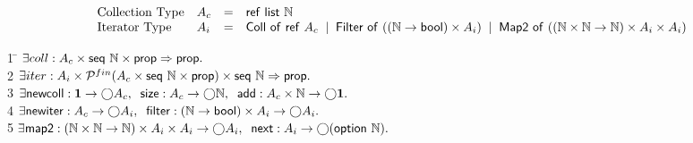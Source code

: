 \documentclass[preprint,natbib]{sigplanconf}
\begin{document}
{\small
\begin{displaymath}
\begin{array}{llcl}
\mbox{Collection Type} & 
A_c & = & \mbox{\textsf{{ref }}}\mbox{\textsf{{list }}}{\mathbb{N}} \\
\mbox{Iterator Type} &
A_i & = & \mbox{\textsf{{Coll of }}}\mbox{\textsf{{ref }}}A_c \;\;|\;\;
          \mbox{\textsf{{Filter of }}}((\mathbb{N} \to \mbox{\textsf{{bool}}}) \times A_i) \;\;|\;\;
          \mbox{\textsf{{Map2 of }}}((\mathbb{N} \times \mathbb{N} \to \mathbb{N}) \times A_i \times A_i) 
\\
\end{array}
\end{displaymath}
\begin{tabbing}
1 \qquad \= $\exists coll : A_c \times \mbox{\textsf{{seq }}}{\mathbb{N}} \times \mbox{\textsf{{prop}}} \Rightarrow \mbox{\textsf{{prop}}}.$ \\
2 \> 
$\exists iter : A_i \times \mathcal{P}^{fin}(A_c \times \mbox{\textsf{{seq }}}{\mathbb{N}} \times \mbox{\textsf{{prop}}}) \times \mbox{\textsf{{seq }}}{\mathbb{N}} \Rightarrow \mbox{\textsf{{prop}}}.$ \\
3 \> 
$\exists \mbox{\textsf{{newcoll}}} : \mathbf{1} \to \bigcirc{A_c}, \;\;
         \mbox{\textsf{{size}}} : A_c \to \bigcirc{\mathbb{N}}, \;\;
         \mbox{\textsf{{add}}} : A_c \times \mathbb{N} \to \bigcirc{\mathbf{1}}.$\\
4 \> 
$\exists \mbox{\textsf{{newiter}}} : A_c \to \bigcirc{A_i}, \;\;
          \mbox{\textsf{{filter}}} : (\mathbb{N} \to \mbox{\textsf{{bool}}}) \times A_i  \to \bigcirc{A_i}.$ \\
5 \> 
$\exists$\=$ \mbox{\textsf{{map2}}} : (\mathbb{N} \times \mathbb{N} \to \mathbb{N}) \times A_i \times A_i \to \bigcirc{A_i}, \;\;
              \mbox{\textsf{{next}}} : A_i \to \bigcirc{(\mbox{\textsf{{option }}}{\mathbb{N}})}.$  \\[0.5em]


\end{tabbing}}
\end{document}
